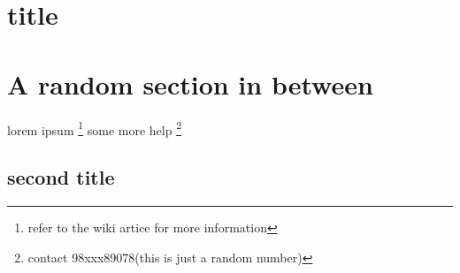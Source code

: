 \documentclass{article}
\begin{document}
\section{title}
\lipsum[1-2]

\pagebreak %
\section{A random section in between}
\lipsum[1-2]
lorem ipsum \footnote{refer to the wiki artice for more information} some more help \footnote{contact 98xxx89078(this is just a random number)}

\begin{landscape}
    \section{second title}
    \lipsum[1-2]
\end{landscape}

\lipsum[1-10] %
\end{document}
